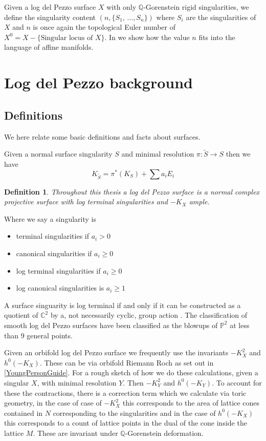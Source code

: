 \documentclass[12pt]{amsbook}
\theoremstyle{plain}
\newtheorem{dfn}[thm]{Definition}
\newcommand{\mb}[1]{\mathbb{#1}}
\newcommand{\ra}{\rightarrow}
\newcommand{\wt}[1]{\widetilde #1}
\begin{document}
Given a log del Pezzo surface $X$ with only $\mb{Q}$-Gorenstein rigid singularities, we define the singularity content $(n, \{S_1, \, \dots, S_n\})$ where $S_i$ are the singularities of $X$ and $n$ is once again the topological Euler number of $X^0 = X - \{\text{Singular locus of } X\}$. In \cite{Section 4} we show how the value $n$ fits into the language of affine manifolds.
\section{Log del Pezzo background}

\subsection{Definitions}
We here relate some basic definitions and facts about surfaces.

Given a normal surface singularity $S$ and minimal resolution $\pi \colon \wt{S} \ra S$ then we have 
\[
K_{\wt{S}} = \pi^*(K_S) + \sum a_i E_i
\] 
\begin{dfn}
Throughout this thesis a log del Pezzo surface is a normal complex projective surface with log terminal singularities and ${-}K_X$ ample.
\end{dfn}
Where we say a singularity is 
\begin{itemize}
\item terminal singularities if $a_i > 0$
\item canonical singularities if $a_i \geq 0$
\item log terminal singularities if $a_i \geq 0$
\item log canonical singularities is $a_i \geq 1$
\end{itemize}
A surface singuarity is log terminal if and only if it can be constructed as a quotient of $\mb{C}^2$  by a, not necessarily cyclic, group action \cite{Kawamata}. The classification of smooth log del Pezzo surfaces have been classified as the blowups of $\mb{P}^2$ at less than $9$ general points.

Given an orbifold log del Pezzo surface we frequently use the invariants 
${-}K_X^2$ and $h^0({-}K_X)$. These can be via orbifold Riemann Roch as set out in \ref{YoungPersonGuide}. For a rough sketch of how we do these calculations, given a singular $X$, with minimal resolution $Y$. Then ${-}K_Y^2$ and $h^0({-}K_Y)$. To account for these the contractions, there is a correction term which we calculate via toric geometry, in the case of case of ${-}K_X^2$ this corresponds to the area of lattice cones contained in $N$ corresponding to the singularities and in the case of $h^0({-}K_X)$ this corresponds to a count of lattice points in the dual of the cone inside the lattice $M$.  These are invariant under $\mb{Q}$-Gorenstein deformation. 
 
\end{document}
